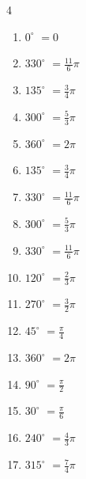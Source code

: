 \begin{multicols}{4}
\begin{enumerate}
  \item $\displaystyle 0^{\circ}$
        $\displaystyle =0$

  \item $\displaystyle 330^{\circ}$
        $\displaystyle =\frac{11}{6}\pi$

  \item $\displaystyle 135^{\circ}$
        $\displaystyle =\frac{3}{4}\pi$

  \item $\displaystyle 300^{\circ}$
        $\displaystyle =\frac{5}{3}\pi$

  \item $\displaystyle 360^{\circ}$
        $\displaystyle =2\pi$

  \item $\displaystyle 135^{\circ}$
        $\displaystyle =\frac{3}{4}\pi$

  \item $\displaystyle 330^{\circ}$
        $\displaystyle =\frac{11}{6}\pi$

  \item $\displaystyle 300^{\circ}$
        $\displaystyle =\frac{5}{3}\pi$

  \item $\displaystyle 330^{\circ}$
        $\displaystyle =\frac{11}{6}\pi$

  \item $\displaystyle 120^{\circ}$
        $\displaystyle =\frac{2}{3}\pi$

\columnbreak %

  \item $\displaystyle 270^{\circ}$
        $\displaystyle =\frac{3}{2}\pi$

  \item $\displaystyle 45^{\circ}$
        $\displaystyle =\frac{\pi}{4}$

  \item $\displaystyle 360^{\circ}$
        $\displaystyle =2\pi$

  \item $\displaystyle 90^{\circ}$
        $\displaystyle =\frac{\pi}{2}$

  \item $\displaystyle 30^{\circ}$
        $\displaystyle =\frac{\pi}{6}$

  \item $\displaystyle 240^{\circ}$
        $\displaystyle =\frac{4}{3}\pi$

  \item $\displaystyle 315^{\circ}$
        $\displaystyle =\frac{7}{4}\pi$


\end{enumerate}
\end{multicols}
